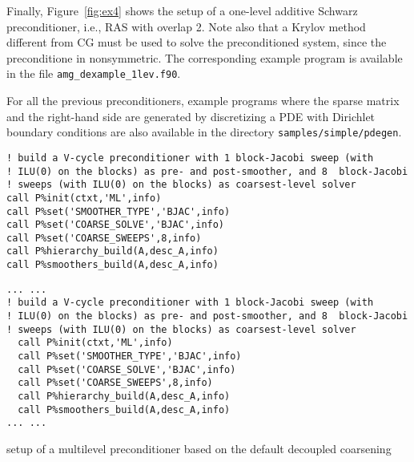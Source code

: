 Finally, Figure~\ref{fig:ex4} shows the setup of a one-level
additive Schwarz preconditioner, i.e., RAS with overlap 2.
Note also that a Krylov method different from CG must be used to solve
the preconditioned system, since the preconditione in nonsymmetric.
The corresponding example program is available in the file
\verb|amg_dexample_1lev.f90|.

For all the previous preconditioners, example programs where the sparse matrix and
the right-hand side are generated by discretizing a PDE with Dirichlet
boundary conditions are also available in the directory \verb|samples/simple/pdegen|.
\vspace{-1em}\begin{listing}[tbh]
\ifpdf%
\begin{verbatim}
! build a V-cycle preconditioner with 1 block-Jacobi sweep (with
! ILU(0) on the blocks) as pre- and post-smoother, and 8  block-Jacobi
! sweeps (with ILU(0) on the blocks) as coarsest-level solver
call P%init(ctxt,'ML',info)
call P%set('SMOOTHER_TYPE','BJAC',info)
call P%set('COARSE_SOLVE','BJAC',info)
call P%set('COARSE_SWEEPS',8,info)
call P%hierarchy_build(A,desc_A,info)
call P%smoothers_build(A,desc_A,info)
\end{verbatim}
\else%
\begin{center}
\begin{minipage}{.90\textwidth}
{\small
\begin{verbatim}
... ...
! build a V-cycle preconditioner with 1 block-Jacobi sweep (with
! ILU(0) on the blocks) as pre- and post-smoother, and 8  block-Jacobi
! sweeps (with ILU(0) on the blocks) as coarsest-level solver
  call P%init(ctxt,'ML',info)
  call P%set('SMOOTHER_TYPE','BJAC',info)
  call P%set('COARSE_SOLVE','BJAC',info)
  call P%set('COARSE_SWEEPS',8,info)
  call P%hierarchy_build(A,desc_A,info)
  call P%smoothers_build(A,desc_A,info)
... ...
\end{verbatim}
}
\end{minipage}
\end{center}
\fi\vspace{-2em}%
\caption{setup of a multilevel preconditioner based on the default decoupled coarsening\label{fig:ex2}}
\end{listing}\vspace*{-2em}
